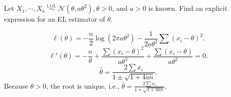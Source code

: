 \begin{ex}
    Let \(X_{1}, \cdots, X_{n} \stackrel{\text { i.i.d. }}{\sim} \mathcal{N}\left(\theta, a \theta^{2}\right), \theta>0\), and \(a>0\) is known. Find an explicit expression for an EL estimator of \(\theta\). 
\end{ex}

\begin{solution}
    \[
        \ell(\theta)=-\frac{n}{2}\log\left(2\pi a\theta^2\right)-\frac{1}{2a\theta^2}\sum(x_i-\theta)^2.
    \]
    \[
        \ell'(\theta)=-\frac{n}{\theta}+\frac{\sum(x_i-\theta)^2}{a\theta^3}+\frac{\sum(x_i-\theta)}{a\theta^2}= 0. 
    \]
    \[
        \hat{\theta}=\frac{2\sum x_i}{1\pm\sqrt{1+4an}}. 
    \]
    Because $\theta>0$, the root is unique, i.e., $\hat{\theta}=\frac{2\sum x_i}{1+\sqrt{1+4an}}$. 
\end{solution}

